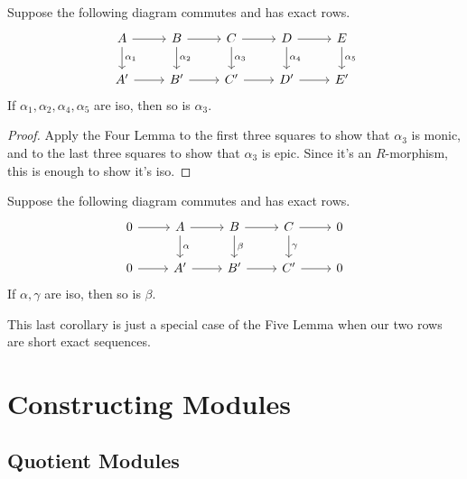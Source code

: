 \documentclass[twoside,10pt]{report}
\begin{document}
\begin{thrm}
Suppose the following diagram commutes and has exact rows.
\[
\begin{tikzcd}
	A\rar\dar{\alpha_1} & B\rar\dar{\alpha_2} & C\rar\dar{\alpha_3} & D\rar\dar{\alpha_4} & E\dar{\alpha_5} \\
	A'\rar & B'\rar & C'\rar & D'\rar & E'
\end{tikzcd}
\] 
If $\alpha_1,\alpha_2,\alpha_4,\alpha_5$ are iso, then so is $\alpha_3$.
\end{thrm}
\begin{proof}
	Apply the Four Lemma to the first three squares to show that $\alpha_3$ is monic, and to the last three squares to show that $\alpha_3$ is epic. Since it's an $R$-morphism, this is enough to show it's iso.
\end{proof}

\begin{cor}
Suppose the following diagram commutes and has exact rows.
\[
\begin{tikzcd}
	0\rar & A\rar\dar{\alpha} & B\rar\dar{\beta} & C\rar\dar{\gamma} & 0 \\
        0\rar & A'\rar & B'\rar & C'\rar & 0
\end{tikzcd}
\] 
If $\alpha,\gamma$ are iso, then so is $\beta$.
\end{cor}

This last corollary is just a special case of the Five Lemma when our two rows are short exact sequences. 



\chapter{Constructing Modules}

\section{Quotient Modules}
\end{document}
